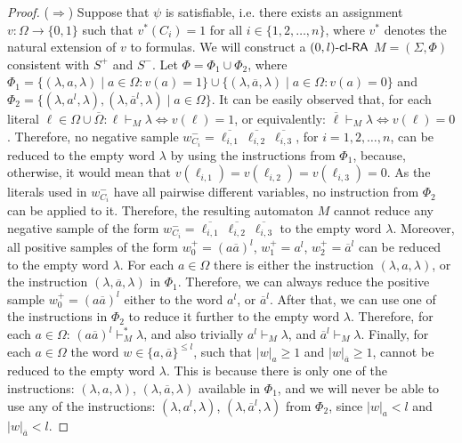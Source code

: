 \begin{proof}
($\Rightarrow$)
Suppose that $\psi$ is satisfiable, i.e. there exists an assignment $v: \Omega \to \{0, 1\}$ such that $v^*(C_i) = 1$ for all $i \in \{1, 2, \ldots, n\}$, where $v^*$ denotes the natural extension of $v$ to formulas. We will construct a $\mbox{\sf $(0,l)$-\mbox{\sf cl-RA\/}}$ $M = (\Sigma, \Phi)$ consistent with $S^+$ and $S^-$. Let $\Phi=\Phi_1 \cup \Phi_2$, where $\Phi_1 = \{ (\lambda, a, \lambda) \mid a \in \Omega: v(a) = 1 \} \cup \{ (\lambda, \overline{a}, \lambda) \mid a \in \Omega: v(a) = 0 \}$ and $\Phi_2 = \{ (\lambda, a^l, \lambda), (\lambda, \overline{a}^l, \lambda) \mid a \in \Omega \}$. It can be easily observed that, for each literal $\ell \in \Omega \cup \overline{\Omega}: \ell \vdash_M \lambda \Leftrightarrow v(\ell) = 1$, or equivalently: $\overline{\ell} \vdash_M \lambda \Leftrightarrow v(\ell) = 0$. Therefore, no negative sample $w_{C_i}^- = \overline{\ell_{i,1}}\ \overline{\ell_{i,2}}\ \overline{\ell_{i,3}}$, for $i = 1, 2, \ldots, n$, can be reduced to the empty word $\lambda$ by using the instructions from $\Phi_1$, because, otherwise, it would mean that $v(\ell_{i,1}) = v(\ell_{i,2}) = v(\ell_{i,3}) = 0$. As the literals used in $w_{C_i}^-$ have all pairwise different variables, no instruction from $\Phi_2$ can be applied to it. Therefore, the resulting automaton $M$ cannot reduce any negative sample of the form  $w_{C_i}^- = \overline{\ell_{i,1}}\ \overline{\ell_{i,2}}\ \overline{\ell_{i,3}}$ to the empty word $\lambda$. Moreover, all positive samples of the form $w_0^+ = (a \overline{a})^l$,  $w_1^+ = a^l$, $w_2^+ = \overline{a}^l$ can be reduced to the empty word $\lambda$. For each $a \in \Omega$ there is either the instruction $(\lambda, a, \lambda)$, or the instruction $(\lambda, \overline{a}, \lambda)$ in $\Phi_1$. Therefore, we can always reduce the positive sample $w_0^+ = (a \overline{a})^l$ either to the word $a^l$, or $\overline{a}^l$. After that, we can use one of the instructions in $\Phi_2$ to reduce it further to the empty word $\lambda$. Therefore, for each $a \in \Omega$: $(a \overline{a})^l \vdash_M^* \lambda$, and also trivially $a^l \vdash_M \lambda$, and $\overline{a}^l \vdash_M \lambda$. Finally, for each $a \in \Omega$ the word $w \in \{a, \overline{a}\}^{\le l}$, such that $|w|_a \ge 1$ and $|w|_{\overline{a}} \ge 1$, cannot be reduced to the empty word $\lambda$. This is because there is only one of the instructions: $(\lambda, a, \lambda)$, $(\lambda, \overline{a}, \lambda)$ available in $\Phi_1$, and we will never be able to use any of the instructions: $(\lambda, a^l, \lambda)$, $(\lambda, \overline{a}^l, \lambda)$ from $\Phi_2$, since $|w|_a < l$ and $|w|_{\overline{a}} < l$.


\end{proof}

